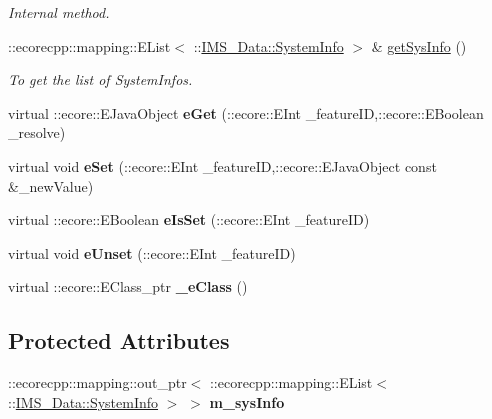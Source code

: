 \begin{DoxyCompactItemize}
\begin{DoxyCompactList}\small\item\em Internal method. \item\end{DoxyCompactList}\item 
::ecorecpp::mapping::EList$<$ ::\hyperlink{classIMS__Data_1_1SystemInfo}{IMS\_\-Data::SystemInfo} $>$ \& \hyperlink{classIMS__Data_1_1ListSysInfo_a747293d6a26eebbedcf9eb385ae9ed89}{getSysInfo} ()
\begin{DoxyCompactList}\small\item\em To get the list of SystemInfos. \item\end{DoxyCompactList}\item 
\hypertarget{classIMS__Data_1_1ListSysInfo_a0cbdd19b97e0e8f5cbf450729768824e}{
virtual ::ecore::EJavaObject {\bfseries eGet} (::ecore::EInt \_\-featureID,::ecore::EBoolean \_\-resolve)}
\label{classIMS__Data_1_1ListSysInfo_a0cbdd19b97e0e8f5cbf450729768824e}

\item 
\hypertarget{classIMS__Data_1_1ListSysInfo_a484ddcb2feb16cede97f597243f20c6f}{
virtual void {\bfseries eSet} (::ecore::EInt \_\-featureID,::ecore::EJavaObject const \&\_\-newValue)}
\label{classIMS__Data_1_1ListSysInfo_a484ddcb2feb16cede97f597243f20c6f}

\item 
\hypertarget{classIMS__Data_1_1ListSysInfo_afd92ae24290f1c94e872146d9cd3bd6c}{
virtual ::ecore::EBoolean {\bfseries eIsSet} (::ecore::EInt \_\-featureID)}
\label{classIMS__Data_1_1ListSysInfo_afd92ae24290f1c94e872146d9cd3bd6c}

\item 
\hypertarget{classIMS__Data_1_1ListSysInfo_abc828ade896589a9e8ac5db43d874bdf}{
virtual void {\bfseries eUnset} (::ecore::EInt \_\-featureID)}
\label{classIMS__Data_1_1ListSysInfo_abc828ade896589a9e8ac5db43d874bdf}

\item 
\hypertarget{classIMS__Data_1_1ListSysInfo_aa298b4956f5bf44d30ffb7ffca9ea8b0}{
virtual ::ecore::EClass\_\-ptr {\bfseries \_\-eClass} ()}
\label{classIMS__Data_1_1ListSysInfo_aa298b4956f5bf44d30ffb7ffca9ea8b0}

\end{DoxyCompactItemize}
\subsection*{Protected Attributes}
\begin{DoxyCompactItemize}
\item 
\hypertarget{classIMS__Data_1_1ListSysInfo_acb898d254cbd77548e9e3b0852428914}{
::ecorecpp::mapping::out\_\-ptr$<$ ::ecorecpp::mapping::EList$<$ ::\hyperlink{classIMS__Data_1_1SystemInfo}{IMS\_\-Data::SystemInfo} $>$ $>$ {\bfseries m\_\-sysInfo}}
\label{classIMS__Data_1_1ListSysInfo_acb898d254cbd77548e9e3b0852428914}

\end{DoxyCompactItemize}


